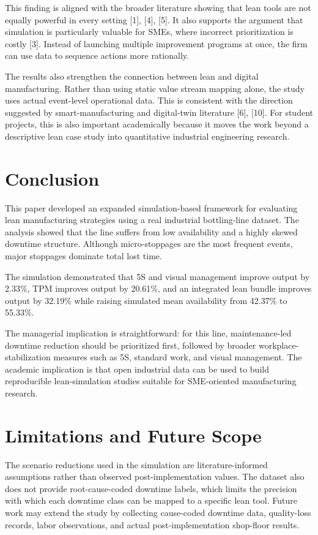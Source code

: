\documentclass[journal]{IEEEtran}
\begin{document}
This finding is aligned with the broader literature showing that lean tools are not equally powerful in every setting [1], [4], [5]. It also supports the argument that simulation is particularly valuable for SMEs, where incorrect prioritization is costly [3]. Instead of launching multiple improvement programs at once, the firm can use data to sequence actions more rationally.

The results also strengthen the connection between lean and digital manufacturing. Rather than using static value stream mapping alone, the study uses actual event-level operational data. This is consistent with the direction suggested by smart-manufacturing and digital-twin literature [6], [10]. For student projects, this is also important academically because it moves the work beyond a descriptive lean case study into quantitative industrial engineering research.

\section{Conclusion}
This paper developed an expanded simulation-based framework for evaluating lean manufacturing strategies using a real industrial bottling-line dataset. The analysis showed that the line suffers from low availability and a highly skewed downtime structure. Although micro-stoppages are the most frequent events, major stoppages dominate total lost time.

The simulation demonstrated that 5S and visual management improve output by 2.33\%, TPM improves output by 20.61\%, and an integrated lean bundle improves output by 32.19\% while raising simulated mean availability from 42.37\% to 55.33\%.

The managerial implication is straightforward: for this line, maintenance-led downtime reduction should be prioritized first, followed by broader workplace-stabilization measures such as 5S, standard work, and visual management. The academic implication is that open industrial data can be used to build reproducible lean-simulation studies suitable for SME-oriented manufacturing research.

\section*{Limitations and Future Scope}
The scenario reductions used in the simulation are literature-informed assumptions rather than observed post-implementation values. The dataset also does not provide root-cause-coded downtime labels, which limits the precision with which each downtime class can be mapped to a specific lean tool. Future work may extend the study by collecting cause-coded downtime data, quality-loss records, labor observations, and actual post-implementation shop-floor results.
\end{document}
